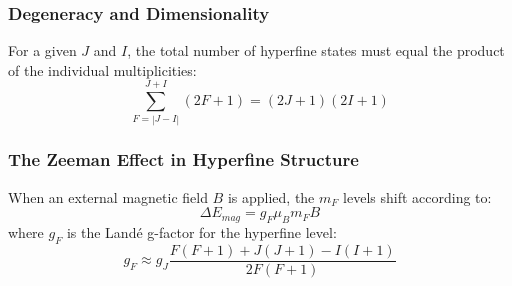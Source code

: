 \subsubsection{Degeneracy and Dimensionality}
For a given $J$ and $I$, the total number of hyperfine states must equal the product of the individual multiplicities:
\begin{equation}
	\sum_{F=|J-I|}^{J+I} (2F + 1) = (2J + 1)(2I + 1)
\end{equation}

\subsubsection{The Zeeman Effect in Hyperfine Structure}
When an external magnetic field $B$ is applied, the $m_F$ levels shift according to:
\begin{equation}
	\Delta E_{mag} = g_F \mu_B m_F B
\end{equation}
where $g_F$ is the Landé g-factor for the hyperfine level:
\begin{equation}
	g_F \approx g_J \frac{F(F+1) + J(J+1) - I(I+1)}{2F(F+1)}
\end{equation}